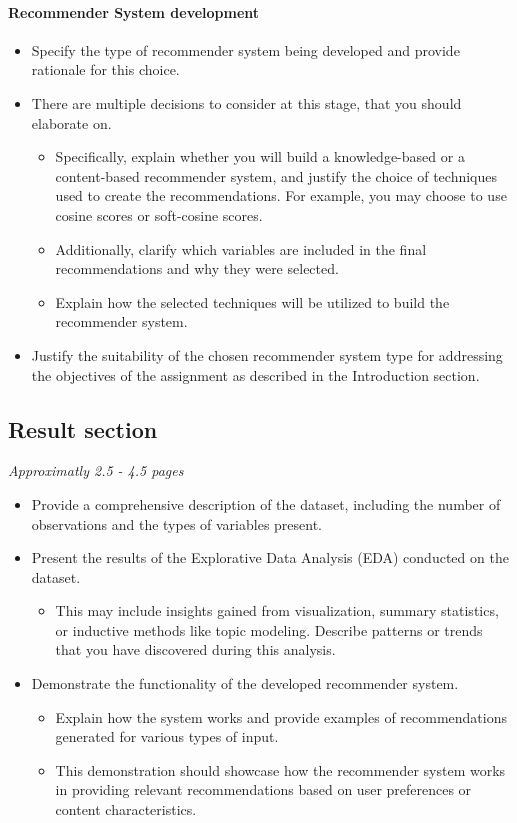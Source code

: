 \paragraph{Recommender System development}
\begin{itemize}
\item Specify the type of recommender system being developed and provide rationale for this choice. 
\item There are multiple decisions to consider at this stage, that you should elaborate on. 
\begin{itemize}
\item Specifically, explain whether you will build a knowledge-based or a content-based recommender system, and justify the choice of techniques used to create the recommendations. For example, you may choose to use cosine scores or soft-cosine scores.
\item Additionally, clarify which variables are included in the final recommendations and why they were selected.
\item Explain how the selected techniques will be utilized to build the recommender system.
\end{itemize}
\item Justify the suitability of the chosen recommender system type for addressing the objectives of the assignment as described in the Introduction section. 
\end{itemize}

\subsection{Result section}
\textit{Approximatly 2.5 - 4.5 pages}

\begin{itemize}
\item Provide a comprehensive description of the dataset, including the number of observations and the types of variables present.
\item Present the results of the Explorative Data Analysis (EDA) conducted on the dataset. 
\begin{itemize}
	\item This may include insights gained from visualization, summary statistics, or inductive methods like topic modeling. Describe patterns or trends that you have discovered during this analysis.
\end{itemize}
\item Demonstrate the functionality of the developed recommender system. 
\begin{itemize}
\item Explain how the system works and provide examples of recommendations generated for various types of input. 
\item This demonstration should showcase how the recommender system works in providing relevant recommendations based on user preferences or content characteristics.
\end{itemize}
\end{itemize}

